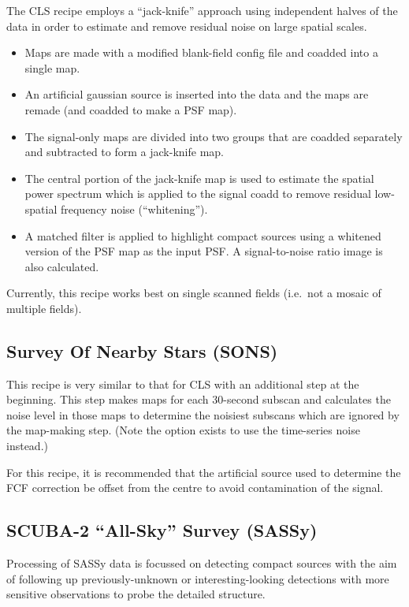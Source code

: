 \documentclass[twoside,11pt,nolof]{starlink}
\begin{document}
The CLS recipe employs a ``jack-knife'' approach using independent
halves of the data in order to estimate and remove residual noise on
large spatial scales.

\begin{itemize}
\item Maps are made with a modified blank-field config file and
  coadded into a single map.
\item An artificial gaussian source is inserted into the data and the
  maps are remade (and coadded to make a PSF map).
\item The signal-only maps are divided into two groups that are
  coadded separately and subtracted to form a jack-knife map.
\item The central portion of the jack-knife map is used to estimate
  the spatial power spectrum which is applied to the signal coadd to
  remove residual low-spatial frequency noise (``whitening'').
\item A matched filter is applied to highlight compact sources using a
  whitened version of the PSF map as the input PSF. A signal-to-noise
  ratio image is also calculated.
\end{itemize}

Currently, this recipe works best on single scanned fields (i.e.\ not
a mosaic of multiple fields).

\subsection{Survey Of Nearby Stars (SONS)}

This recipe is very similar to that for CLS with an additional step at
the beginning. This step makes maps for each 30-second subscan and
calculates the noise level in those maps to determine the noisiest
subscans which are ignored by the map-making step. (Note the option
exists to use the time-series noise instead.)

For this recipe, it is recommended that the artificial source used to
determine the FCF correction be offset from the centre to avoid
contamination of the signal.

\subsection{SCUBA-2 ``All-Sky'' Survey (SASSy)}

Processing of SASSy data is focussed on detecting compact sources with
the aim of following up previously-unknown or interesting-looking
detections with more sensitive observations to probe the detailed
structure.
\end{document}
